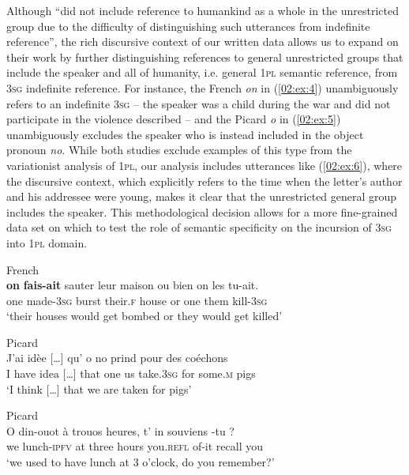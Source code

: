 \documentclass[output=paper,colorlinks,citecolor=brown]{langscibook}
\begin{document}
\z
\z

Although \citet[482]{king_interplay_2011} “did not include reference to humankind as a whole in the unrestricted group due to the difficulty of distinguishing such utterances from indefinite reference”, the rich discursive context of our written data allows us to expand on their work by further distinguishing references to general unrestricted groups that include the speaker and all of humanity, i.e. general 1\textsc{pl} semantic reference, from 3\textsc{sg} indefinite reference. For instance, the French \textit{on} in (\ref{02:ex:4}) unambiguously refers to an indefinite 3\textsc{sg} -- the speaker was a child during the war and did not participate in the violence described -- and the Picard \textit{o} in (\ref{02:ex:5}) unambiguously excludes the speaker who is instead included in the object pronoun \textit{no}. While both studies exclude examples of this type from the variationist analysis of 1\textsc{pl}, our analysis includes utterances like (\ref{02:ex:6}), where the discursive context, which explicitly refers to the time when the letter’s author and his addressee were young, makes it clear that the unrestricted general group includes the speaker. This methodological decision allows for a more fine-grained data set on which to test the role of semantic specificity on the incursion of 3\textsc{sg} into 1\textsc{pl} domain.

\ea \label{02:ex:4} French\\
\gll \textbf{on} 	\textbf{fais-ait}	       sauter 	leur 	maison   {ou bien}  on 	les 	tu-ait.\\
one 	made-3\textsc{sg}   burst 	their.\textsc{f} 	house     or 	    one 	them 	kill-3\textsc{sg}\\ 
\glt ‘their houses would get bombed or they would get killed’
\z

\ea \label{02:ex:5} Picard\\
\gll J’ai 	idèe [\ldots] 	qu’  o 	  no 	prind 	  pour 	des 	  coéchons\\
{I have} 	idea [\ldots] 	that one us 	take.3\textsc{sg} for 	some.\textsc{m}  pigs\\ 
\glt ‘I think [\ldots] that we are taken for pigs’
\z

\ea \label{02:ex:6} Picard\\
\gll O 	din-ouot   à 	trouos heures, t’	    in 	  souviens  -tu ? \\
we 	lunch-\textsc{ipfv} at 	three   hours    you.\textsc{refl} of-it 	  recall        you\\ 
\glt ‘we used to have lunch at 3 o’clock, do you remember?’
\z
\end{document}
